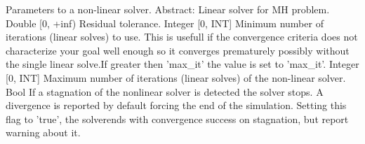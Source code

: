 \begin{RecordType}
	{}
	{} %
	{} %
	{} %
	{{{Parameters to a non-linear solver.}}}
		\KeyItem
			{}
			{{Abstract}{: }}
			{\textlangle{ \it{{\{}{\}}} }\textrangle}
			{} %
			{{{Linear solver for MH problem.}}}
		\KeyItem
			{}
			{{Double [0, +inf)}}
			{\textrangle}
			{} %
			{{{Residual tolerance.}}}
		\KeyItem
			{}
			{{Integer [0, INT]}}
			{\textrangle}
			{} %
			{{{Minimum number of iterations (linear solves) to use. This is usefull if the convergence criteria does not characterize your goal well enough so it converges prematurely possibly without the single linear solve.If greater then 'max{\_}it' the value is set to 'max{\_}it'.}}}
		\KeyItem
			{}
			{{Integer [0, INT]}}
			{\textrangle}
			{} %
			{{{Maximum number of iterations (linear solves) of the non-linear solver.}}}
		\KeyItem
			{}
			{{Bool}}
			{\textrangle}
			{} %
			{{{If a stagnation of the nonlinear solver is detected the solver stops. A divergence is reported by default forcing the end of the simulation. Setting this flag to 'true', the solverends with convergence success on stagnation, but report warning about it.}}}
\end{RecordType}
